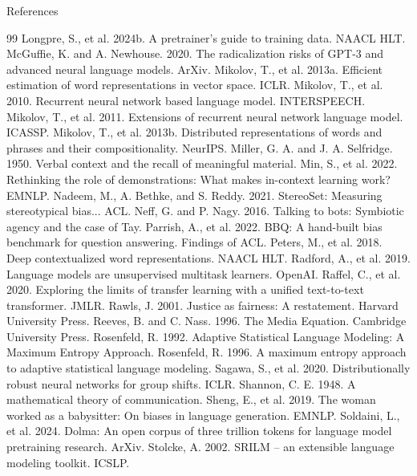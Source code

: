 \documentclass[aspectratio=169]{beamer}
\begin{document}
\begin{frame}[allowframebreaks]{References}
\begin{thebibliography}{99}
     Longpre, S., et al. 2024b. A pretrainer’s guide to training data. NAACL HLT.
     McGuffie, K. and A. Newhouse. 2020. The radicalization risks of GPT-3 and advanced neural language models. ArXiv.
     Mikolov, T., et al. 2013a. Efficient estimation of word representations in vector space. ICLR.
     Mikolov, T., et al. 2010. Recurrent neural network based language model. INTERSPEECH.
     Mikolov, T., et al. 2011. Extensions of recurrent neural network language model. ICASSP.
     Mikolov, T., et al. 2013b. Distributed representations of words and phrases and their compositionality. NeurIPS.
     Miller, G. A. and J. A. Selfridge. 1950. Verbal context and the recall of meaningful material.
     Min, S., et al. 2022. Rethinking the role of demonstrations: What makes in-context learning work? EMNLP.
     Nadeem, M., A. Bethke, and S. Reddy. 2021. StereoSet: Measuring stereotypical bias... ACL.
     Neff, G. and P. Nagy. 2016. Talking to bots: Symbiotic agency and the case of Tay.
     Parrish, A., et al. 2022. BBQ: A hand-built bias benchmark for question answering. Findings of ACL.
     Peters, M., et al. 2018. Deep contextualized word representations. NAACL HLT.
     Radford, A., et al. 2019. Language models are unsupervised multitask learners. OpenAI.
     Raffel, C., et al. 2020. Exploring the limits of transfer learning with a unified text-to-text transformer. JMLR.
     Rawls, J. 2001. Justice as fairness: A restatement. Harvard University Press.
     Reeves, B. and C. Nass. 1996. The Media Equation. Cambridge University Press.
     Rosenfeld, R. 1992. Adaptive Statistical Language Modeling: A Maximum Entropy Approach.
     Rosenfeld, R. 1996. A maximum entropy approach to adaptive statistical language modeling.
     Sagawa, S., et al. 2020. Distributionally robust neural networks for group shifts. ICLR.
     Shannon, C. E. 1948. A mathematical theory of communication.
     Sheng, E., et al. 2019. The woman worked as a babysitter: On biases in language generation. EMNLP.
     Soldaini, L., et al. 2024. Dolma: An open corpus of three trillion tokens for language model pretraining research. ArXiv.
     Stolcke, A. 2002. SRILM – an extensible language modeling toolkit. ICSLP.

\end{thebibliography}
\end{frame}
\end{document}
